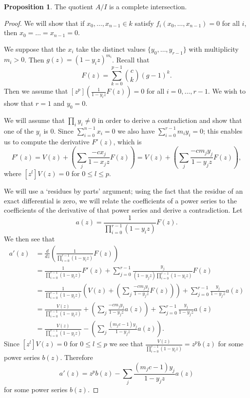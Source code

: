 \documentclass{amsart}
\numberwithin{equation}{section}
\theoremstyle{definition}
\newtheorem{proposition}[theorem]{Proposition}
\begin{document}
\begin{proposition}\label{prop:ci}
The quotient $A/I$ is a complete intersection. 
\end{proposition}
\begin{proof} 
We will show that if $x_0,\dots,x_{n-1} \in k$ satisfy $f_i(x_0,\dots,x_{n-1})=0$ for all $i$, then $x_0=\dots=x_{n-1}=0$. 

We suppose that the $x_i$ take the distinct values $\{y_0,\dots,y_{r-1}\}$ with multiplicity $m_i>0$. Then $g(z)=(1-y_iz)^{m_i}$. Recall that
\[
F(z)=\sum_{k=0}^{p-1} \binom{c}{k}(g-1)^k.
\]
Then we assume that $[z^p]\left(\frac{1}{1-y_iz}F(z)\right)=0$ for all $i=0,\dots,r-1$. We wish to show that $r=1$ and $y_0=0$. 

We will assume that $\prod_i y_i \ne 0$ in order to derive a contradiction and show that one of the $y_i$ is $0$. Since $\sum_{i=0}^{n-1} x_i=0$ we also have $\sum_{i=0}^{r-1} m_iy_i=0$; this enables us to compute the derivative $F'(z)$, which is 
\[
F'(z)=V(z)+\left(\sum_j \frac{-cx_j}{1-x_jz}F(z)\right)=V(z)+\left(\sum_j \frac{-cm_jy_j}{1-y_jz}F(z)\right),
\]
where $[z^l]V(z)=0$ for $0 \le l \le p$. 

We will use a `residues by parts' argument; using the fact that the residue of an exact differential is zero, we will relate the coefficients of a power series to the coefficients of the derivative of that power series and derive a contradiction. 
Let
\[
a(z)=\frac{1}{\prod_{i=0}^{r-1}(1-y_iz)}F(z).
\]
We then see that
\begin{align*}
a'(z)&=\frac{d}{dz}\left(\frac{1}{\prod_{i=0}^{r-1}(1-y_iz)}F(z)\right)\\
&=\frac{1}{\prod_{i=0}^{r-1}(1-y_iz)}F'(z)+\sum_{j=0}^{r-1}\frac{y_j}{(1-y_jz)\prod_{i=0}^{r-1}(1-y_iz)}F(z)\\
&=\frac{1}{\prod_{i=0}^{r-1}(1-y_iz)}\left(V(z)+\left(\sum_j \frac{-cm_jy_j}{1-y_jz}F(z)\right)\right)+\sum_{j=0}^{r-1}\frac{y_j}{1-y_jz}a(z)\\
&=\frac{V(z)}{\prod_{i=0}^{r-1}(1-y_iz)}+\left(\sum_j \frac{-cm_jy_j}{1-y_jz}a(z)\right)+\sum_{j=0}^{r-1}\frac{y_j}{1-y_jz}a(z)\\
&=\frac{V(z)}{\prod_{i=0}^{r-1}(1-y_iz)}-\left(\sum_j \frac{(m_jc-1)y_j}{1-y_jz}a(z)\right).
\end{align*}
Since $[z^l]V(z)=0$ for $0 \le l \le p$ we see that $\frac{V(z)}{\prod_{i=0}^{r-1}(1-y_iz)}=z^pb(z)$ for some power series $b(z)$. Therefore
\[
a'(z)=z^pb(z)-\sum_j \frac{(m_jc-1)y_j}{1-y_jz}a(z)
\]
for some power series $b(z)$.


\end{proof}
\end{document}
